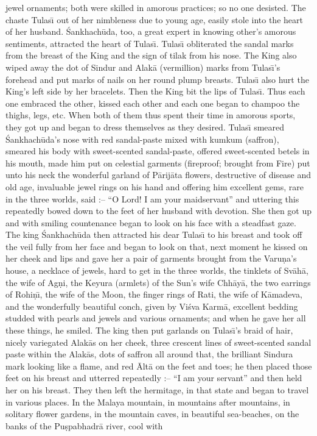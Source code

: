 jewel ornaments; both were skilled in amorous practices; so no one desisted. The chaste Tulas\={\i} out of her nimbleness due to young age, easily stole into the heart of her husband. \'Sankhach\=uda, too, a great expert in knowing other's amorous sentiments, attracted the heart of Tulas\={\i}. Tulas\={\i} obliterated the sandal marks from the breast of the King and the sign of tilak from his nose. The King also wiped away the dot of Sindur and Alak\=a (vermillion) marks from Tulas\={\i}'s forehead and put marks of nails on her round plump breasts. Tulas\={\i} also hurt the King's left side by her bracelets. Then the King bit the lips of Tulas\={\i}. Thus each one embraced the other, kissed each other and each one began to champoo the thighs, legs, etc. When both of them thus spent their time in amorous sports, they got up and began to dress themselves as they desired. Tulas\={\i} smeared \'Sankhach\=uda's nose with red sandal-paste mixed with kumkum (saffron), smeared his body with sweet-scented sandal-paste, offered sweet-scented betels in his mouth, made him put on celestial garments (fireproof; brought from Fire) put unto his neck the wonderful garland of P\=arij\=ata flowers, destructive of disease and old age, invaluable jewel rings on his hand and offering him excellent gems, rare in the three worlds, said :-- ``O Lord! I am your maidservant'' and uttering this repeatedly bowed down to the feet of her husband with devotion. She then got up and with smiling countenance began to look on his face with a steadfast gaze. The king \'Sankhach\=uda then attracted his dear Tulas\={\i} to his breast and took off the veil fully from her face and began to look on that, next moment he kissed on her cheek and lips and gave her a pair of garments brought from the Varu\d{n}a's house, a necklace of jewels, hard to get in the three worlds, the tinklets of Sv\=ah\=a, the wife of Ag\d{n}i, the Keyura (armlets) of the Sun's wife Chh\=ay\=a, the two earrings of Rohi\d{n}\={\i}, the wife of the Moon, the finger rings of Rati, the wife of K\=amadeva, and the wonderfully beautiful conch, given by Vi\'sva Karm\=a, excellent bedding studded with pearls and jewels and various ornaments; and when he gave her all these things, he smiled. The king then put garlands on Tulas\={\i}'s braid of hair, nicely variegated Alak\=as on her cheek, three crescent lines of sweet-scented sandal paste within the Alak\=as, dots of saffron all around that, the brilliant Sindura mark looking like a flame, and red \=Alt\=a on the feet and toes; he then placed those feet on his breast and utterred repeatedly :-- ``I am your servant'' and then held her on his breast. They then left the hermitage, in that state and began to travel in various places. In the Malaya mountain, in mountains after mountains, in solitary flower gardens, in the mountain caves, in beautiful sea-beaches, on the banks of the Pu\d{s}pabhadr\=a river, cool with

